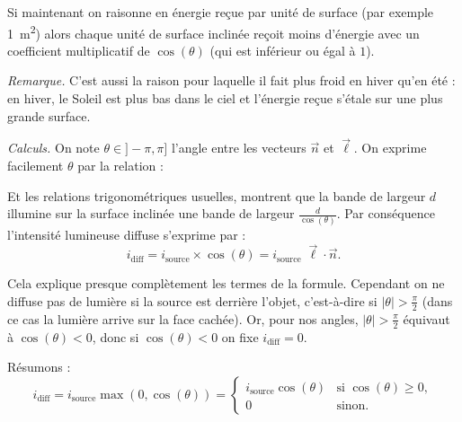 \documentclass[11pt,class=report,crop=false]{standalone}
\begin{document}


Si maintenant on raisonne en énergie reçue par unité de surface (par exemple \SI{1}{\meter^2}) alors chaque unité de surface inclinée reçoit moins d'énergie avec un coefficient multiplicatif de $\cos(\theta)$ (qui est inférieur ou égal à $1$).


\medskip

\emph{Remarque.} 
C'est aussi la raison pour laquelle il fait plus froid en hiver qu'en été : en hiver, le Soleil est plus bas dans le ciel et l'énergie reçue s'étale sur une plus grande surface.

\medskip

\emph{Calculs.}
On note $\theta \in ]-\pi,\pi]$ l'angle entre les vecteurs $\vec n$ et $\vec \ell$.
On exprime facilement $\theta$ par la relation :

\begin{center}
\begin{minipage}{0.4\textwidth}
\end{minipage}\qquad
\begin{minipage}{0.4\textwidth}
\end{minipage}
\end{center}

Et les relations trigonométriques usuelles, montrent que la bande de largeur $d$ illumine sur la surface inclinée une bande de largeur $\frac{d}{\cos(\theta)}$.
Par conséquence l'intensité lumineuse diffuse s'exprime par :
$$i_{\text{diff}} =  i_{\text{source}} \times \cos(\theta) = i_{\text{source}} \; \vec \ell \cdot \vec n.$$

Cela explique presque complètement les termes de la formule. Cependant on ne diffuse pas de lumière si la source est derrière l'objet, c'est-à-dire si $|\theta| > \frac\pi2$ (dans ce cas la lumière arrive sur la face cachée). Or, pour nos angles, 
$|\theta| > \frac\pi2$ équivaut à $\cos(\theta) < 0$, donc si $\cos(\theta) < 0$ on fixe $i_{\text{diff}} = 0$.


Résumons :
$$i_{\text{diff}} =  i_{\text{source}} \max(0,\cos(\theta)) = 
\begin{cases}
i_{\text{source}}\cos(\theta) & \text{si }\cos(\theta) \ge 0,\\
0 & \text{sinon.}
\end{cases}$$
\end{document}
